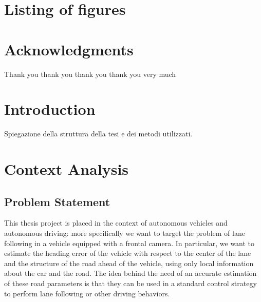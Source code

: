 \documentclass[a4paper,12pt,sort&compress]{article}
\begin{document}
\tableofcontents
\newpage

\section{Listing of figures}

    \newpage


\section{Acknowledgments}

    Thank you thank you thank you thank you very much
    \newpage


\section{Introduction}

    Spiegazione della struttura della tesi e dei metodi utilizzati.
    \newpage


\section{Context Analysis}

\subsection{Problem Statement}
    This thesis project is placed in the context of autonomous vehicles and
    autonomous driving: more specifically we want to target the problem of lane
    following in a vehicle equipped with a frontal camera. In particular, we
    want to estimate the heading error of the vehicle with respect to the center
    of the lane and the structure of the road ahead of the vehicle, using only
    local information about the car and the road. The idea behind the need of an
    accurate estimation of these road parameters is that they can be used in a
    standard control strategy to perform lane following or other driving
    behaviors.
\end{document}
